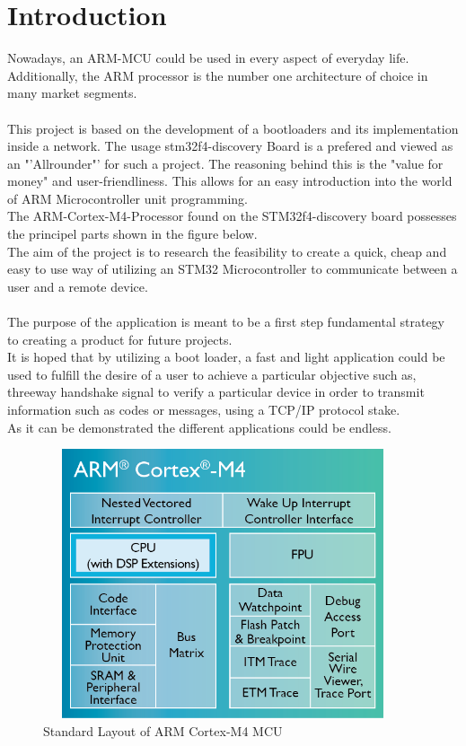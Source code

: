 \chapter{Introduction}

\glsaddall

Nowadays, an ARM-MCU could be used in every aspect of everyday life.
Additionally, the ARM processor is the number one architecture of choice in 
many market segments.\\\\ 
This project is based on the development of a bootloaders and its implementation 
inside a network. The usage stm32f4-discovery Board is a prefered and viewed as an 
"'Allrounder"' for such a project. The reasoning behind this is the "value for money" 
and user-friendliness. This allows for an easy introduction into the world of ARM
Microcontroller unit programming.\citep{ST-15}\\
The ARM-Cortex-M4-Processor found on the STM32f4-discovery board possesses  
the principel parts shown in the figure below.\\
The aim of the project is to research the feasibility to create a quick, cheap 
and easy to use way of utilizing an STM32 Microcontroller to communicate between 
a user and a remote device.\citep{ARM-14}\\\\
The purpose of the application is meant to be a first step fundamental strategy to 
creating a product for future projects.\\
It is hoped that by utilizing a boot loader, a fast and light application could 
be used to fulfill the desire of a user to achieve a particular objective such 
as, threeway handshake signal to verify a particular device in order to transmit 
information such as codes or messages, using a TCP/IP protocol stake.\\
As it can be demonstrated the different applications could be endless.\\ 

\begin{figure}[ht]
	\centering
	\includegraphics[width=400px, height=300px]{../img/Cortex-M4-chip-diagram-LG.png}
	\caption{Standard Layout of ARM Cortex-M4 MCU}
	\label{m4_prinzip}
\end{figure}


